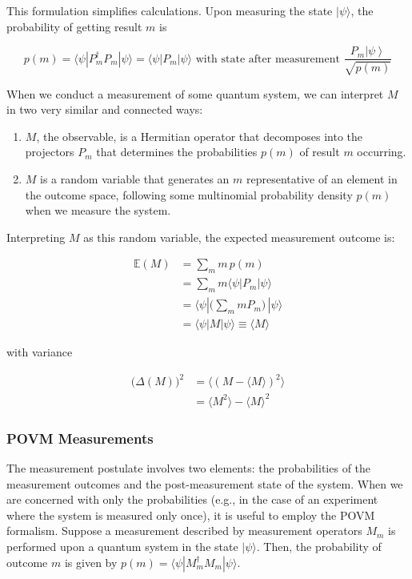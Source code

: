 \documentclass{article}
\newcommand{\ket}[1]{\ensuremath{\left|#1\right\rangle}}
\theoremstyle{definition}
\begin{document}
      This formulation simplifies calculations. Upon measuring the state $|\psi\rangle$, the probability of getting result $m$ is

        \[p(m) = \langle \psi | P_m^\dagger P_m | \psi \rangle = \langle \psi | P_m | \psi \rangle \text{ with state after measurement } \frac{P_m  \ket{\psi}}{\sqrt{p(m)}}\]

      When we conduct a measurement of some quantum system, we can interpret $M$ in two very similar and connected ways:

      \begin{enumerate}
        \item $M$, the observable, is a Hermitian operator that decomposes into the projectors $P_m$ that determines the probabilities $p(m)$ of result $m$ occurring.
        \item $M$ is a random variable that generates an $m$ representative of an element in the outcome space, following some multinomial probability density $p(m)$ when we measure the system.
      \end{enumerate}

      Interpreting $M$ as this random variable, the expected measurement outcome is:

      \begin{align*}
        \mathbb{E}(M) & = \sum_m m\, p(m) \\
        & = \sum_m m \langle \psi | P_m | \psi \rangle \\
        & = \langle \psi | \bigg( \sum_m m P_m \bigg) \, | \psi \rangle \\
        & = \langle \psi | M | \psi \rangle \equiv \langle M \rangle
      \end{align*}

      with variance

      \begin{align*}
        \big( \Delta (M)\big)^2 & = \langle (M - \langle M \rangle )^2 \rangle \\
        & = \langle M^2 \rangle - \langle M \rangle^2
      \end{align*}


    \subsubsection{POVM Measurements}

      The measurement postulate involves two elements: the probabilities of the measurement outcomes and the post-measurement state of the system. When we are concerned with only the probabilities (e.g., in the case of an experiment where the system is measured only once), it is useful to employ the POVM formalism. Suppose a measurement described by measurement operators $M_m$ is performed upon a quantum system in the state $|\psi\rangle$. Then, the probability of outcome $m$ is given by $p(m) = \langle \psi | M_m^\dagger M_m | \psi \rangle$. 
\end{document}
